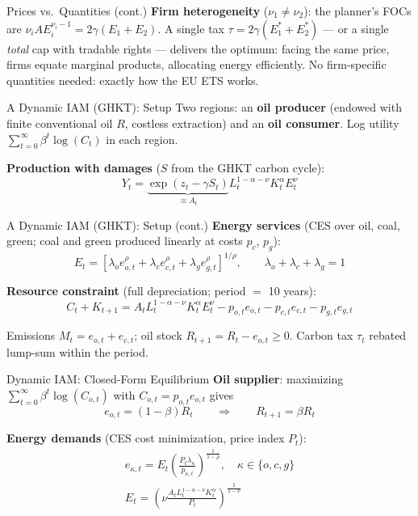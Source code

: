\documentclass[blue]{beamer}
\begin{document}
\begin{frame}{Prices vs.\ Quantities (cont.)}
\bigskip
\textbf{Firm heterogeneity} ($\nu_1 \neq \nu_2$): the planner's FOCs are $\nu_i A E_i^{\nu_i - 1} = 2\gamma(E_1 + E_2)$. A single tax $\tau = 2\gamma(E_1^* + E_2^*)$ --- or a single \emph{total} cap with tradable rights --- delivers the optimum: facing the same price, firms equate marginal products, allocating energy efficiently. No firm-specific quantities needed: exactly how the EU ETS works.
\end{frame}

\begin{frame}{A Dynamic IAM (GHKT): Setup}
Two regions: an \textbf{oil producer} (endowed with finite conventional oil $R$, costless extraction) and an \textbf{oil consumer}. Log utility $\sum_{t=0}^{\infty}\beta^t\log(C_t)$ in each region.

\bigskip
\textbf{Production with damages} ($S$ from the GHKT carbon cycle):
\[
Y_t = \underbrace{\exp(z_t - \gamma S_t)}_{\equiv A_t}L_t^{1-\alpha-\nu}K_t^{\alpha}E_t^{\nu}
\]

\end{frame}

\begin{frame}{A Dynamic IAM (GHKT): Setup (cont.)}
\textbf{Energy services} (CES over oil, coal, green; coal and green produced linearly at costs $p_c$, $p_g$):
\[
E_t = \left[\lambda_o e_{o,t}^{\rho} + \lambda_c e_{c,t}^{\rho} + \lambda_g e_{g,t}^{\rho}\right]^{1/\rho}, \qquad \lambda_o + \lambda_c + \lambda_g = 1
\]

\textbf{Resource constraint} (full depreciation; period $=$ 10 years):
\[
C_t + K_{t+1} = A_tL_t^{1-\alpha-\nu}K_t^{\alpha}E_t^{\nu} - p_{o,t}e_{o,t} - p_{c,t}e_{c,t} - p_{g,t}e_{g,t}
\]

Emissions $M_t = e_{o,t} + e_{c,t}$; oil stock $R_{t+1} = R_t - e_{o,t} \geq 0$. Carbon tax $\tau_t$ rebated lump-sum within the period.
\end{frame}

\begin{frame}{Dynamic IAM: Closed-Form Equilibrium}
\textbf{Oil supplier}: maximizing $\sum_{t=0}^{\infty}\beta^t\log(C_{o,t})$ with $C_{o,t} = p_{o,t}e_{o,t}$ gives
\[
e_{o,t} = (1-\beta)R_t \qquad \Rightarrow \qquad R_{t+1} = \beta R_t
\]

\textbf{Energy demands} (CES cost minimization, price index $P_t$):
\begin{gather*}
e_{\kappa,t} = E_t\left(\frac{P_t\lambda_\kappa}{p_{\kappa,t}}\right)^{\frac{1}{1-\rho}}, \quad \kappa \in \{o, c, g\} \\
E_t = \left(\nu\frac{A_tL_t^{1-\alpha-\nu}K_t^{\alpha}}{P_t}\right)^{\frac{1}{1-\nu}}
\end{gather*}

\end{frame}
\end{document}

